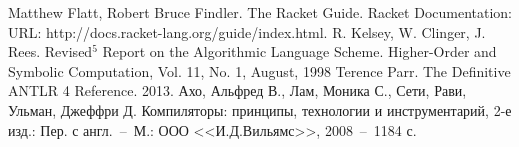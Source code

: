 \documentclass[12pt,a4paper,oneside]{extarticle}
\begin{document}


\clearpage


\begin{thebibliography}{0}
     Matthew Flatt, Robert Bruce Findler. The Racket Guide. Racket Documentation: URL: http://docs.racket-lang.org/guide/index.html.
     R. Kelsey, W. Clinger, J. Rees. Revised$^5$ Report on the Algorithmic Language Scheme. Higher-Order and Symbolic Computation, Vol. 11, No. 1, August, 1998
     Terence Parr. The Definitive ANTLR 4 Reference. 2013.
     Ахо, Альфред В., Лам, Моника С., Сети, Рави, Ульман, Джеффри Д. Компиляторы: принципы, технологии и инструментарий, 2-е изд.: Пер. с англ.~--~М.: ООО <<И.Д.Вильямс>>, 2008~--~1184 с.
        
\end{thebibliography}
\end{document}
